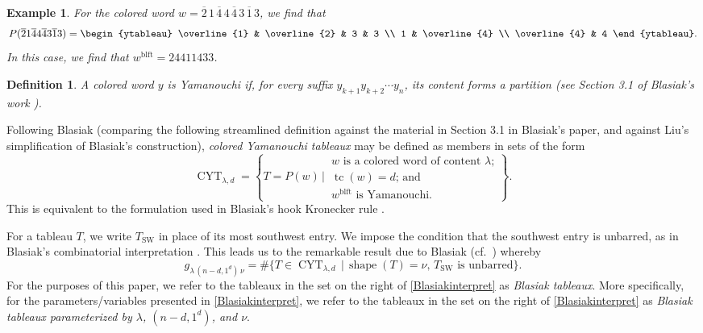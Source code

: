 \documentclass[12pt]{article}
\newtheorem{definition}{Definition}
\newtheorem{example}{Example}
\begin{document}
\begin{example}
 For the colored word $w = \overline{2} \, 1 \, \overline{4} \, 4 \, \overline{4} \, 3 \, \overline{1} \, 3$, we find that 
 $$ P(\overline{2}1\overline{4}4\overline{4}3\overline{1}3)= \begin{ytableau} \overline{1} & \overline{2} & 3 & 3 \\ 1 & \overline{4} \\ 
 \overline{4} & 4 \end{ytableau}. $$ In this case, we find that $w^{\operatorname{blft}} = 24411433$. 
\end{example}

\begin{definition}
 A colored word $y$ is Yamanouchi if, for every suffix $y_{k+1} y_{k+2}\cdots y_n$, its content forms a partition (see Section 3.1 of 
 Blasiak's work \cite{Blasiak20162018}). 
\end{definition}

 Following Blasiak \cite{Blasiak20162018} (comparing the following streamlined definition against the material in Section 3.1 in Blasiak's 
 paper, and against Liu's simplification \cite{Liu2017} of Blasiak's construction), \emph{colored Yamanouchi tableaux} may be defined
 as members in sets of the form 
\begin{equation}\label{CYTd}
 \operatorname{CYT}_{\lambda, d} = \left\{ T = P(w) \, \Bigg| \, \begin{matrix}
 \text{$w$ is a colored word of content $\lambda$;} \\
 \text{$\operatorname{tc}(w) = d$; and} \\
 \text{$w^{\operatorname{blft}}$ is Yamanouchi.}
 \end{matrix} \right\}. 
\end{equation}
 This is equivalent to the formulation used in Blasiak's hook Kronecker rule \cite[Theorem 3.5]{Blasiak20162018}. 

 For a tableau $T$, we write $T_{\operatorname{SW}}$ in place of its most southwest entry. We impose the condition that the 
 southwest entry is unbarred, as in Blasiak's combinatorial interpretation \cite{Blasiak20162018}. This leads us to the remarkable 
 result due to Blasiak (cf.\ \cite[Theorem 3.5]{Blasiak20162018}) whereby
\begin{equation}\label{Blasiakinterpret}
 g_{\lambda \, (n-d, 1^d) \, \nu} = \#\{ T \in \operatorname{CYT}_{\lambda, d} \, | \, \operatorname{shape}(T) = \nu, \, 
 \text{$T_{\operatorname{SW}}$ is unbarred} \}.
\end{equation}
 For the purposes of this paper, we refer to the tableaux in the set on the right of \eqref{Blasiakinterpret} as \emph{Blasiak tableaux}. 
 More specifically, for the parameters/variables presented in \eqref{Blasiakinterpret}, we refer to the tableaux in the set on the right 
 of \eqref{Blasiakinterpret} as \emph{Blasiak tableaux parameterized by $\lambda$, $(n-d, 1^{d})$, and $\nu$}. 
\end{document}
